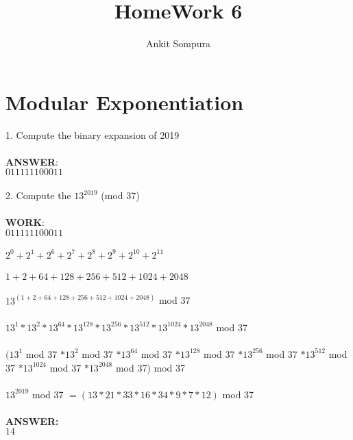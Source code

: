 \documentclass[11pt]{article}
\title{HomeWork 6}
\author{Ankit Sompura}
\begin{document}
\maketitle

\section{Modular Exponentiation}
1. Compute the binary expansion of 2019 \\\\
\textbf{ANSWER}: \\
$011111100011$\\\\
2. Compute the $13^{2019}$
(mod 37)\\\\
\textbf{WORK}:\\
$011111100011$\\\\
$2^0 + 2^1 + 2^6 + 2^7 + 2^8 + 2^9 + 2^{10} + 2^{11}$\\\\
$ 1 + 2 + 64 + 128 + 256 + 512 + 1024 + 2048  $ \\\\
$13^{(1 + 2 + 64 + 128 + 256 + 512 + 1024 + 2048)}$
mod 37\\\\
$13^1 * 13^2 * 13^{64} * 13^{128} * 13^{256} * 13^{512} * 13^{1024} * 13^{2048}$
mod 37\\\\
$(13^1$ 
mod 37 
$* 13^2$
mod 37 
$ * 13^{64} $
mod 37 
$* 13^{128} $
mod 37
$* 13^{256}$
mod 37
$ * 13^{512}$
mod 37
$ * 13^{1024}$
mod 37
$ * 13^{2048}$
mod 37)
mod 37\\\\
$13^{2019}$
mod 37 $= ( 13 * 21 * 33 * 16 * 34 * 9 * 7 * 12)$
mod 37\\\\
\textbf{ANSWER:} \\
$14$\\\\
\end{document}
